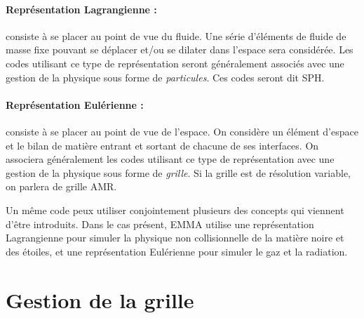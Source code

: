 \paragraph{Représentation Lagrangienne : } 
consiste à se placer au point de vue du fluide.
Une série d'éléments de fluide de masse fixe pouvant se déplacer et/ou se dilater dans l'espace sera considérée.
Les codes utilisant ce type de représentation seront généralement associés avec une gestion de la physique sous forme de \emph{particules}.
Ces codes seront dit \ac{SPH}.


\paragraph{Représentation Eulérienne : } 
consiste à se placer au point de vue de l'espace.
On considère un élément d'espace et le bilan de matière entrant et sortant de chacune de ses interfaces.
On associera généralement les codes utilisant ce type de représentation avec une gestion de la physique sous forme de \emph{grille}.
Si la grille est de résolution variable, on parlera de grille \ac{AMR}.


Un même code peux utiliser conjointement plusieurs des concepts qui viennent d'être introduits.
Dans le cas présent, EMMA utilise une représentation Lagrangienne pour simuler la physique non collisionnelle de la matière noire et des étoiles, et une représentation Eulérienne pour simuler le gaz et la radiation.

\section{Gestion de la grille}
\label{sec_gestion_grille}


